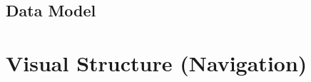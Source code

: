 \documentclass[11pt,english,numbers=endperiod,parskip=half]{scrartcl}
\begin{document}
  \subsection{Data Model}
  \begin{figure}[H]
  \end{figure}
\section{Visual Structure (Navigation)}
\end{document}
